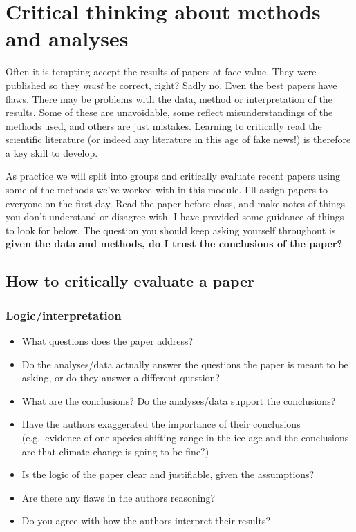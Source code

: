 \documentclass[]{book}
\theoremstyle{definition}
\theoremstyle{definition}
\theoremstyle{definition}
\theoremstyle{remark}
\begin{document}
\chapter{Critical thinking about methods and
analyses}\label{critical-thinking-about-methods-and-analyses}

Often it is tempting accept the results of papers at face value. They
were published so they \emph{must} be correct, right? Sadly no. Even the
best papers have flaws. There may be problems with the data, method or
interpretation of the results. Some of these are unavoidable, some
reflect misunderstandings of the methods used, and others are just
mistakes. Learning to critically read the scientific literature (or
indeed any literature in this age of fake news!) is therefore a key
skill to develop.

As practice we will split into groups and critically evaluate recent
papers using some of the methods we've worked with in this module. I'll
assign papers to everyone on the first day. Read the paper before class,
and make notes of things you don't understand or disagree with. I have
provided some guidance of things to look for below. The question you
should keep asking yourself throughout is \textbf{given the data and
methods, do I trust the conclusions of the paper?}

\section{How to critically evaluate a
paper}\label{how-to-critically-evaluate-a-paper}

\subsection{Logic/interpretation}\label{logicinterpretation}

\begin{itemize}
\item
  What questions does the paper address?
\item
  Do the analyses/data actually answer the questions the paper is meant
  to be asking, or do they answer a different question?
\item
  What are the conclusions? Do the analyses/data support the
  conclusions?
\item
  Have the authors exaggerated the importance of their conclusions
  (e.g.~evidence of one species shifting range in the ice age and the
  conclusions are that climate change is going to be fine?)
\item
  Is the logic of the paper clear and justifiable, given the
  assumptions?
\item
  Are there any flaws in the authors reasoning?
\item
  Do you agree with how the authors interpret their results?
\end{itemize}
\end{document}
